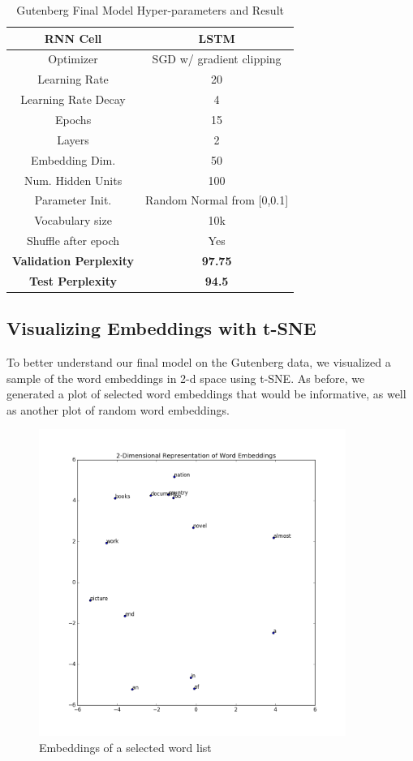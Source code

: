 \documentclass[a4paper]{article}
\begin{document}
\begin{table}[H]
\centering
\begin{tabular}{|c | c|} 
 \hline
RNN Cell & LSTM\\ \hline
Optimizer & SGD w/ gradient clipping \\ \hline
Learning Rate & 20 \\ \hline
Learning Rate Decay & 4 \\ \hline
Epochs & 15\\ \hline
Layers & 2\\ \hline
Embedding Dim. & 50\\ \hline
Num. Hidden Units & 100\\ \hline
Parameter Init. & Random Normal from [0,0.1]\\ \hline
Vocabulary size & 10k\\ \hline
Shuffle after epoch & Yes \\ \hline
\textbf{Validation Perplexity} &\textbf{97.75} \\ \hline
\textbf{Test Perplexity} &\textbf{94.5} \\ \hline
\end{tabular}
\caption{Gutenberg Final Model Hyper-parameters and Result}
\label{table:1}
\end{table}

\subsection{Visualizing Embeddings with t-SNE}
To better understand our final model on the Gutenberg data, we visualized a sample of the word embeddings in 2-d space using t-SNE. As before, we generated a plot of selected word embeddings that would be informative, as well as another plot of random word embeddings.

\begin{figure}[H]
  \includegraphics[width=10cm]{../plots/gutenberg_word_list_embeddings.png}
  \centering
  \caption{Embeddings of a selected word list}
  \label{fig:boat1}
\end{figure}
\end{document}
